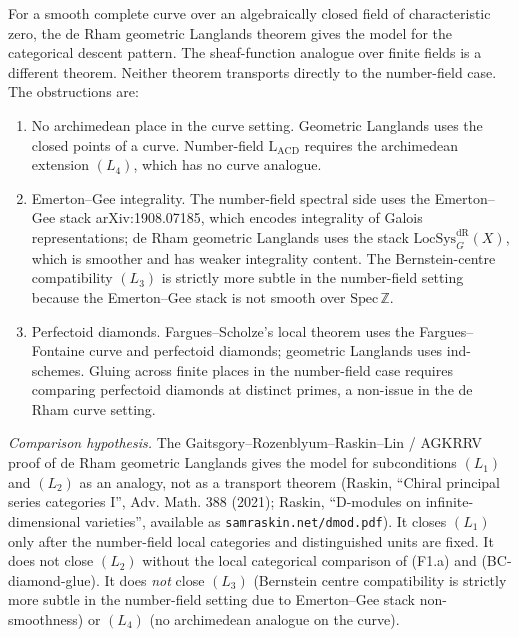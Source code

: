 For a smooth complete curve over an algebraically closed field of
characteristic zero, the de Rham geometric Langlands theorem gives the
model for the categorical descent pattern.  The sheaf-function
analogue over finite fields is a different theorem.  Neither theorem
transports directly to the number-field case.  The obstructions are:
\begin{enumerate}
\item No archimedean place in the curve setting. Geometric Langlands
uses the closed points of a curve. Number-field \(\mathrm{L}_{\mathrm{ACD}}\)
requires the archimedean extension \((L_{4})\), which has no curve
analogue.
\item Emerton--Gee integrality. The number-field spectral side uses
the Emerton--Gee stack arXiv:1908.07185, which encodes integrality
of Galois representations; de Rham geometric Langlands uses the stack
\(\mathrm{LocSys}^{\mathrm{dR}}_{G}(X)\), which is smoother and has
weaker integrality content. The Bernstein-centre compatibility
\((L_{3})\) is strictly more subtle in the number-field setting
because the Emerton--Gee stack is not smooth over
\(\mathrm{Spec}\,\mathbb{Z}\).
\item Perfectoid diamonds. Fargues--Scholze's local theorem uses the
Fargues--Fontaine curve and perfectoid diamonds; geometric Langlands
uses ind-schemes. Gluing across finite places in the
number-field case requires comparing perfectoid diamonds at
distinct primes, a non-issue in the de Rham curve setting.
\end{enumerate}

\begin{theorem}
\label{v4-arith:acd:thm:function-field-transport}
\emph{Comparison hypothesis.} The Gaitsgory--Rozenblyum--Raskin--Lin /
AGKRRV proof of de Rham geometric Langlands gives the model for
subconditions \((L_{1})\) and \((L_{2})\) as an analogy, not as a
transport theorem (Raskin,
``Chiral principal series categories I'', Adv. Math. 388 (2021);
Raskin, ``D-modules on infinite-dimensional varieties'', available
as \texttt{samraskin.net/dmod.pdf}). It closes \((L_{1})\) only after
the number-field local categories and distinguished units are fixed.
It does not close \((L_{2})\) without the local categorical comparison
of (F1.a) and (BC-diamond-glue).
It does \emph{not} close \((L_{3})\) (Bernstein centre compatibility
is strictly more subtle in the number-field setting due to
Emerton--Gee stack non-smoothness) or \((L_{4})\) (no archimedean
analogue on the curve).
\end{theorem}

